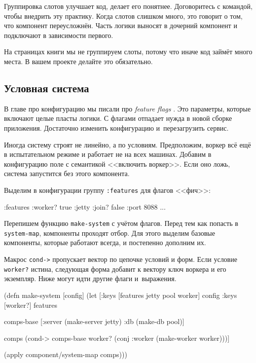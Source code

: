 Группировка слотов улучшает код, делает его понятнее. Договоритесь с командой,
чтобы внедрить эту практику. Когда слотов слишком много, это говорит о том, что
компонент переусложнён. Часть логики выносят в дочерний компонент и подключают в
зависимости первого.

На страницах книги мы не группируем слоты, потому что иначе код займёт много
места. В вашем проекте делайте это обязательно.

\subsection{Условная система}


В главе про конфигурацию мы писали про \emph{feature flags} .
Это параметры, которые включают целые пласты логики. С флагами отпадает нужда в новой сборке
приложения. Достаточно изменить конфигурацию и~перезагрузить сервис.

Иногда систему строят не линейно, а по условиям. Предположим, воркер всё ещё в
испытательном режиме и работает не на всех машинах. Добавим в конфигурацию поле
с семантикой <<включить воркер>>. Если оно ложь, система запустится без этого
компонента.


Выделим в конфигурации группу \verb|:features| для флагов <<фич>>:

\begin{english}
  \begin{clojure}
{:features {:worker? true}
 :jetty {:join? false :port 8088}
 ...}
  \end{clojure}
\end{english}

Перепишем функцию \verb|make-system| с учётом флагов. Перед тем как попасть в
\verb|system-map|, компоненты проходят отбор. Для этого выделим базовые
компоненты, которые работают всегда, и постепенно дополним их.

Макрос \verb|cond->| пропускает вектор по цепочке условий и форм. Если условие
\verb|worker?| истина, следующая форма добавит к вектору ключ воркера и его
экземпляр. Ниже могут идти другие флаги и~выражения.

\ifnarrow

\begin{english}
  \begin{clojure}
(defn make-system [config]
  (let [{:keys [features
                jetty
                pool
                worker]} config
        {:keys [worker?]} features

        comps-base
        [:server (make-server jetty)
         :db     (make-db pool)]

        comps (cond-> comps-base
                worker?
                (conj :worker
                  (make-worker worker)))]

    (apply component/system-map comps)))
  \end{clojure}
\end{english}

